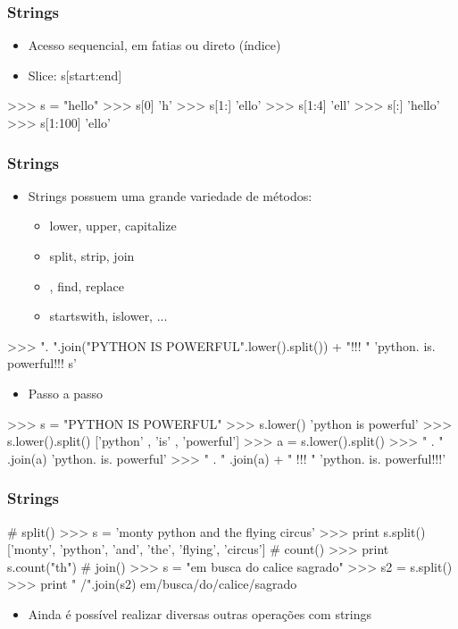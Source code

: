 \documentclass[12pt,t,graphics]{beamer}
\newcommand{\ft}[1]{\frametitle{#1}}
\newcommand{\bi}{\begin{itemize}}
\newcommand{\ei}{\end{itemize}}
\begin{document}

\begin{frame}[fragile]
  \ft{Strings}
  \bi
\item Acesso sequencial, em fatias ou direto (índice)
\item Slice: s[start:end]
 \ei	
  \begin{python}
    >>> s = "hello"
    >>> s[0]
    'h'
    >>> s[1:]
    'ello'
    >>> s[1:4]
    'ell'
    >>> s[:]
    'hello'
    >>> s[1:100]
    'ello'
  \end{python}	
\end{frame}


\begin{frame}[fragile]
  \ft{Strings}
  \bi
\item Strings possuem uma grande variedade de métodos:
  \bi
\item lower, upper, capitalize
\item split, strip, join
\item, find, replace
\item startswith, islower, ...
  \ei
  \ei	
  \begin{python}
    >>> ". ".join("PYTHON IS POWERFUL".lower().split()) + "!!! "
    'python. is. powerful!!! s'		
  \end{python}	
  \bi
\item Passo a passo
  \ei
  \begin{python}
    >>> s = "PYTHON IS POWERFUL"
    >>> s.lower()
    'python is powerful'
    >>> s.lower().split()
    ['python' , 'is' , 'powerful']
    >>> a = s.lower().split()
    >>> " . " .join(a)
    'python. is. powerful'
    >>> " . " .join(a) + " !!! "
    'python. is. powerful!!!' 		
  \end{python}
\end{frame}


\begin{frame}[fragile]
  \ft{Strings}
  \begin{python}
    # split()
    >>> s = 'monty python and the flying circus'
    >>> print s.split()
    ['monty', 'python', 'and', 'the', 'flying', 'circus'] 
    # count()
    >>> print s.count("th")
    # join()
    >>> s = "em busca do calice sagrado"
    >>> s2 = s.split()
    >>> print " /".join(s2)
    em/busca/do/calice/sagrado		
  \end{python}
  \bi
\item Ainda é possível realizar diversas outras
  operações com strings
  \ei
\end{frame}
\end{document}
